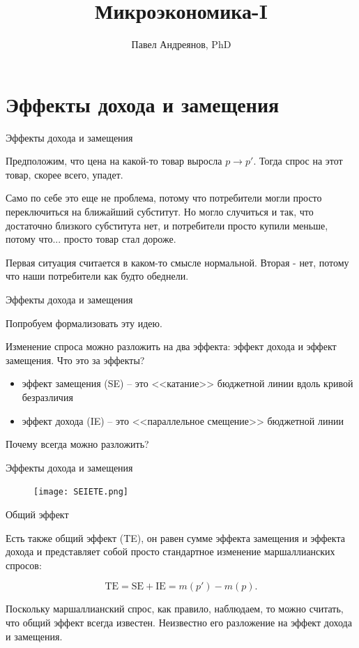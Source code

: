 \documentclass{beamer}
\title{
Микроэкономика-I
}
\author{
Павел Андреянов, PhD
}
\begin{document}
\maketitle

\section{Эффекты дохода и замещения}

\begin{frame}{Эффекты дохода и замещения}

Предположим, что цена на какой-то товар выросла $p \to p'$. Тогда спрос на этот товар, скорее всего, упадет. 

Само по себе это еще не проблема, потому что потребители могли просто переключиться на ближайший субститут. Но могло случиться и так, что достаточно близкого субститута нет, и потребители просто купили меньше, потому что... просто товар стал дороже. 

Первая ситуация считается в каком-то смысле нормальной. Вторая - нет, потому что наши потребители как будто обеднели.
\end{frame}


\begin{frame}{Эффекты дохода и замещения}

Попробуем формализовать эту идею. 

Изменение спроса можно разложить на два эффекта: эффект дохода и эффект замещения. Что это за эффекты?

\begin{itemize}
\item эффект замещения (SE) – это <<катание>> бюджетной линии вдоль кривой безразличия
\item эффект дохода (IE) – это <<параллельное смещение>> бюджетной линии
\end{itemize}

Почему всегда можно разложить? 

\end{frame}

\begin{frame}{Эффекты дохода и замещения}

\begin{figure}[hbt]
\centering
\texttt{[image: SEIETE.png]}
\end{figure}

\end{frame}

\begin{frame}{Общий эффект}

Есть также общий эффект (TE), он равен сумме эффекта замещения и эффекта дохода и представляет собой просто стандартное изменение маршаллианских спросов:

$$ \text{TE} = \text{SE} + \text{IE} = m(p') - m(p).$$

Поскольку маршаллианский спрос, как правило, наблюдаем, то можно считать, что общий эффект всегда известен. Неизвестно его разложение на эффект дохода и замещения.

\end{frame}
\end{document}
